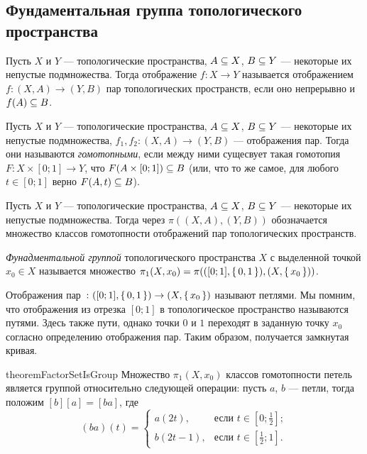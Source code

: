 \documentclass[main]{subfiles}
\begin{document}
\subsection{Фундаментальная группа топологического пространства}

\begin{definition}
	Пусть $X$ и $ Y $ --- топологические пространства, $ A \subseteq X $, $ B \subseteq Y $ --- некоторые их непустые
	подмножества. Тогда отображение $ f \colon X \to Y $ называется отображением $ f \colon (X, A) \to (Y, B) $
	пар топологических пространств, если оно непрерывно и $ f(A) \subseteq B $.
\end{definition}

\begin{definition}
	Пусть $X$ и $ Y $ --- топологические пространства, $ A \subseteq X $, $ B \subseteq Y $ --- некоторые их непустые
	подмножества, $ f_1, f_2 \colon (X, A) \to (Y, B) $ --- отображения пар. Тогда они называются \emph{гомотопными},
	если между ними сущесвует такая гомотопия $ F \colon X \times [0; 1] \to Y $, что $ F(A \times [0; 1]) \subseteq B $
	(или, что то же самое, для любого $ t \in [0; 1] $ верно $ F(A, t) \subseteq B $).
\end{definition}

\begin{definition}
	Пусть $X$ и $ Y $ --- топологические пространства, $ A \subseteq X $, $ B \subseteq Y $ --- некоторые их непустые
	подмножества. Тогда через $ \pi((X, A), (Y, B))$ обозначается множество классов гомотопности отображений пар
	топологических пространств.
\end{definition}

\begin{definition}
	\emph{Фунадментальной группой} топологического пространства $ X $ с выделенной точкой $ x_0 \in X $ называется
	множество $ \pi_1(X, x_0) = \pi(([0; 1], \left\{\,0, 1\,\right\}), (X, \left\{\,x_0\,\right\})) $.
\end{definition}

\begin{remark}
	Отображения пар $ \colon ([0; 1], \left\{\,0, 1\,\right\}) \to (X, \left\{\,x_0\,\right\}) $ называют петлями. Мы помним, что отображения из
	отрезка $ [0; 1] $ в топологическое пространство называются путями. Здесь также пути, однако точки $ 0 $ и $ 1 $
	переходят в заданную точку $ x_0 $ согласно определению отображения пар. Таким образом, получается замкнутая
	кривая.
\end{remark}

\begin{restatable}{theorem}{FactorSetIsGroup}
	Множество $ \pi_1(X, x_0) $ классов гомотопности петель является группой относительно следующей операции:
	пусть $ a $, $ b $ --- петли, тогда положим $ [b][a] = [ba] $, где
		\[ (ba)(t) = \begin{cases}
				a(2 t), & \text{если } t \in \left[ 0; \frac{1}{2} \right]; \\
				b(2 t - 1), & \text{если } t \in \left[ \frac{1}{2}; 1 \right].
			\end{cases}
		\]
\end{restatable}
\end{document}

